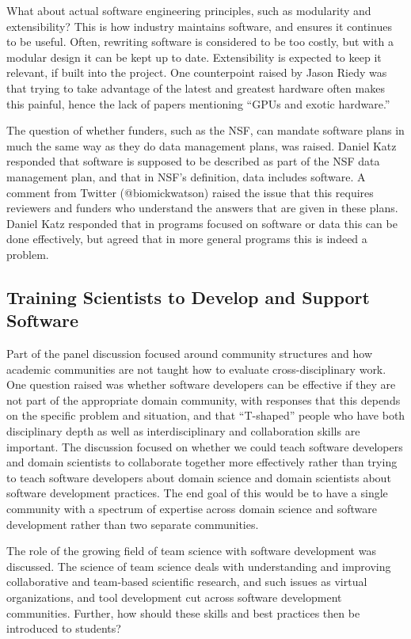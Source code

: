 \documentclass[11pt, oneside]{amsart}
\begin{document}
What about actual software engineering principles, such as modularity and
extensibility? This is how industry maintains software, and ensures it continues
to be useful. Often, rewriting software is considered to be too costly, but
with a modular design it can be kept up to date. Extensibility is expected to keep
it relevant, if built into the project. One counterpoint raised by Jason Riedy
was that trying to take advantage of the latest and greatest hardware often
makes this painful, hence the lack of papers mentioning ``GPUs and exotic
hardware.''

The question of whether funders, such as the NSF, can mandate software plans in
much the same way as they do data management plans, was raised. Daniel Katz responded that
software is supposed to be described as part of the NSF data management plan,
and that in NSF's definition, data includes software. A comment from Twitter
(@biomickwatson) raised the issue that this requires reviewers and funders who
understand the answers that are given in these plans. Daniel Katz responded
that in programs focused on software or data this can be done effectively, but
agreed that in more general programs this is indeed a problem.


\subsection{Training Scientists to Develop and Support Software}
Part of the panel discussion focused around community structures and how academic communities are not taught how to evaluate cross-disciplinary work. 
One question raised was whether software developers can be effective if they are not part
of the appropriate domain community, with responses that this depends on the 
specific problem and situation, and that ``T-shaped'' people who have both disciplinary depth as well as interdisciplinary and collaboration skills are important. 
The discussion focused on  whether we could teach software developers and domain scientists to 
collaborate together more effectively rather than trying to teach software developers
about domain science and domain scientists about software development practices. 
The end goal of this would be to have a single community with a spectrum of expertise across
domain science and software development rather than two separate communities. 

The role of the growing field of team science with software development  was discussed. The science of team science
deals with understanding and improving collaborative and team-based scientific research, and such issues as virtual organizations, 
and tool development cut across software development communities. Further, how should these skills and best practices then be 
introduced to students?
\end{document}
